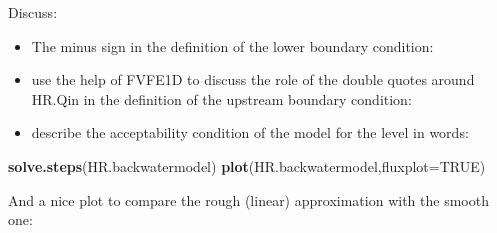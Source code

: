\documentclass[
]{article}
\newenvironment{Shaded}{\begin{snugshade}}{\end{snugshade}}
\newcommand{\AttributeTok}[1]{\textcolor[rgb]{0.13,0.29,0.53}{#1}}
\newcommand{\ConstantTok}[1]{\textcolor[rgb]{0.56,0.35,0.01}{#1}}
\newcommand{\FunctionTok}[1]{\textcolor[rgb]{0.13,0.29,0.53}{\textbf{#1}}}
\newcommand{\NormalTok}[1]{#1}
\providecommand{\tightlist}{%
  \setlength{\itemsep}{0pt}\setlength{\parskip}{0pt}}
\begin{document}
Discuss:

\begin{itemize}
\tightlist
\item
  The minus sign in the definition of the lower boundary condition:
\end{itemize}

\begin{itemize}
\tightlist
\item
  use the help of FVFE1D to discuss the role of the double quotes around
  HR.Qin in the definition of the upstream boundary condition:
\end{itemize}

\begin{itemize}
\tightlist
\item
  describe the acceptability condition of the model for the level in
  words:
\end{itemize}

\begin{Shaded}
\begin{Highlighting}[]
\FunctionTok{solve.steps}\NormalTok{(HR.backwatermodel)}
\FunctionTok{plot}\NormalTok{(HR.backwatermodel,}\AttributeTok{fluxplot=}\ConstantTok{TRUE}\NormalTok{)}
\end{Highlighting}
\end{Shaded}

And a nice plot to compare the rough (linear) approximation with the
smooth one:
\end{document}

